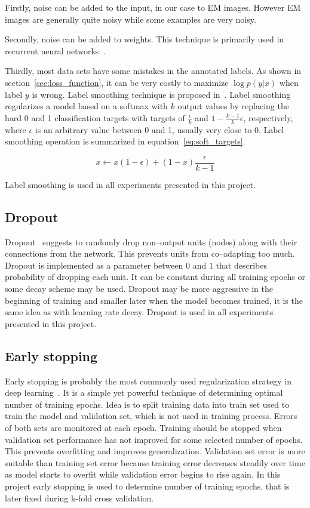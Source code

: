 \documentclass[a4paper, 11pt, table]{article}
\begin{document}
Firstly, noise can be added to the input, in our case to EM images. However EM images are generally quite noisy while some examples are very noisy. 

Secondly, noise can be added to weights. This technique is primarily used in recurrent neural networks~\cite{pmid18263536}. 

Thirdly, most data sets have some mistakes in the annotated labels. As shown in section~\ref{sec:loss_function}, it can be very costly to maximize $\log p(y|x)$ when label $y$ is wrong. Label smoothing technique is proposed in~\cite{dl_book}. Label smoothing regularizes a model based on a softmax with $k$ output values by replacing the hard 0 and 1 classification targets with targets of $\frac{\epsilon}{k}$ and $1 - \frac{k-1}{k}\epsilon$, respectively, where $\epsilon$ is an arbitrary value between 0 and 1, usually very close to 0. Label smoothing operation is summarized in equation~\ref{eq:soft_targets}.

\begin{equation}
\label{eq:soft_targets}
x \leftarrow x \left( 1 - \epsilon \right) + \left(1 - x\right) \frac{\epsilon}{k - 1}
\end{equation}

Label smoothing is used in all experiments presented in this project.

\subsection{Dropout}
\label{sec:dropout}
Dropout~\cite{JMLR:v15:srivastava14a} suggests to randomly drop non--output units (nodes) along with their connections from the network. This prevents units from co--adapting too much. Dropout is implemented as a parameter between $0$ and $1$ that describes probability of dropping each unit. It can be constant during all training epochs or some decay scheme may be used. Dropout may be more aggressive in the beginning of training and smaller later when the model becomes trained, it is the same idea as with learning rate decay. Dropout is used in all experiments presented in this project.


\subsection{Early stopping}
Early stopping is probably the most commonly used regularization strategy in deep learning~\cite{dl_book}. It is a simple yet powerful technique of determining optimal number of training epochs. Idea is to split training data into train set used to train the model and validation set, which is not used in training process. Errors of both sets are monitored at each epoch. Training should be stopped when validation set performance has not improved for some selected number of epochs. This prevents overfitting and improves generalization. Validation set error is more suitable than training set error because training error decreases steadily over time as model starts to overfit while validation error begins to rise again. 
In this project early stopping is used to determine number of training epochs, that is later fixed during k-fold cross validation.
\end{document}
